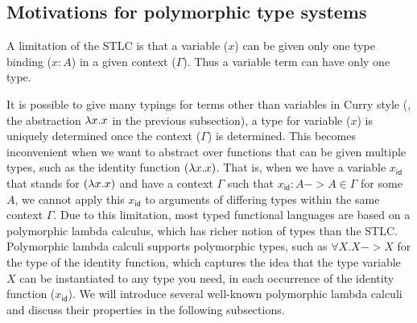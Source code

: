 \begin{comment}
For example, consider the reduction $(\l x'.x')(\l x.x) --> \l x.x$.
We can give different types to the term before the reduction and the
term after the reduction. For example,
\[\setpremisesend{.1em} 
\inference[\sc App]
 {
   \inference[\sc Lam]
     { \inference[\sc Var]
         {x' : \iota -> \iota ~\in~ \cdot, x' : \iota -> \iota}
         {\cdot,x' : \iota -> \iota |- x': \iota -> \iota}
     }
     {\cdot |- \l x'.x' : (\iota -> \iota) -> (\iota -> \iota)}
 &
   \inference[\sc Lam]
     {\inference[\sc Var]{x:\iota ~\in~ \cdot,x:\iota}
                         {\cdot,x:\iota |- x:\iota} \phantom{x'}}
     {\cdot |- \l x.x : \iota -> \iota \phantom{(x')}}
 }
 {\cdot |- (\l x'.x')(\l x.x) : \iota -> \iota}
\]
\\
\[\qquad\qquad\qquad\quad
\inference[\sc Lam]
  {\inference[\sc Var]{x:\iota->\iota ~\in~ \cdot,x:\iota->\iota}
                      {\cdot,x:\iota->\iota |- x:\iota->\iota} }
  {\cdot |- \l x.x : (\iota -> \iota) -> (\iota -> \iota)}
\]


\end{comment}


\subsection{Motivations for polymorphic type systems}\label{sec:stlc:topoly}
A limitation of the STLC is that a variable ($x$) can be given only one
type binding ($x:A$) in a given context ($\Gamma$). Thus a variable
term can have only one type.

It is possible to give many typings for terms
other than variables in Curry style (\eg, the abstraction $\lambda x .x$ 
in the previous subsection), a type for variable ($x$) is uniquely determined
once the context ($\Gamma$) is determined. This becomes inconvenient
when we want to abstract over functions that can be given multiple types,
such as the identity function $(\lambda x.x)$. That is, when we have a variable
$x_\textsf{id}$ that stands for $(\lambda x.x)$ and have a context $\Gamma$
such that $x_\textsf{id}:A -> A \in \Gamma$ for some $A$, we cannot apply
this $x_\textsf{id}$ to arguments of differing types within the same context
$\Gamma$. Due to this limitation, most typed functional languages are based on
a polymorphic lambda calculus, which has richer notion of types than the STLC.
Polymorphic lambda calculi supports polymorphic types, such as
$\forall X.X -> X$ for the type of the identity function, which captures
the idea that the type variable $X$ can be instantiated to any type you need,
in each occurrence of the identity function ($x_\textsf{id}$).
We will introduce several well-known polymorphic lambda calculi and
discuss their properties in the following subsections.

